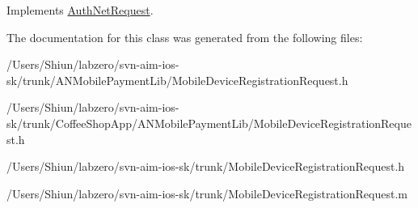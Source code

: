 Implements \hyperlink{interface_auth_net_request_aab99d065f49b7ed086b041c1c70e2975}{AuthNetRequest}.



The documentation for this class was generated from the following files:\begin{DoxyCompactItemize}
\item 
/Users/Shiun/labzero/svn-\/aim-\/ios-\/sk/trunk/ANMobilePaymentLib/MobileDeviceRegistrationRequest.h\item 
/Users/Shiun/labzero/svn-\/aim-\/ios-\/sk/trunk/CoffeeShopApp/ANMobilePaymentLib/MobileDeviceRegistrationRequest.h\item 
/Users/Shiun/labzero/svn-\/aim-\/ios-\/sk/trunk/MobileDeviceRegistrationRequest.h\item 
/Users/Shiun/labzero/svn-\/aim-\/ios-\/sk/trunk/MobileDeviceRegistrationRequest.m\end{DoxyCompactItemize}
